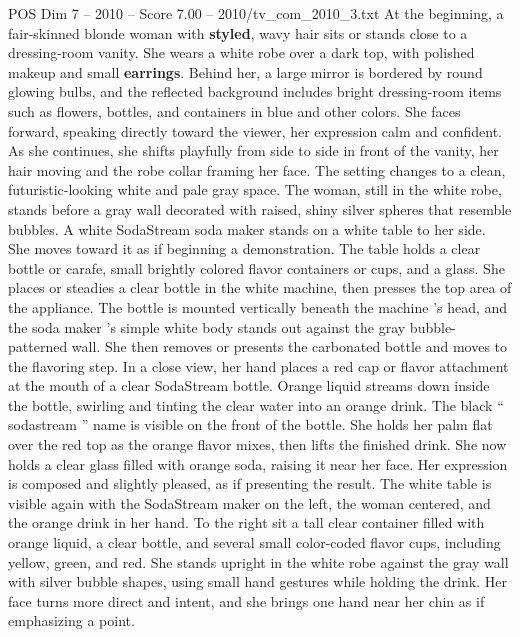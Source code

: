 \begin{textsample}{POS Dim 7 – 2010 – Score 7.00 – 2010/tv\_com\_2010\_3.txt}  \label{ex:f7_pos_057}
At the beginning, a fair-skinned blonde woman with \textbf{styled}, wavy hair sits or stands close to a dressing-room vanity.
She wears a white robe over a dark top, with polished makeup and small \textbf{earrings}.
Behind her, a large mirror is bordered by round glowing bulbs, and the reflected background includes bright dressing-room items such as flowers, bottles, and containers in blue and other colors.
She faces forward, speaking directly toward the viewer, her expression calm and confident.
As she continues, she shifts playfully from side to side in front of the vanity, her hair moving and the robe collar framing her face.
The setting changes to a clean, futuristic-looking white and pale gray space.
The woman, still in the white robe, stands before a gray wall decorated with raised, shiny silver spheres that resemble bubbles.
A white SodaStream soda maker stands on a white table to her side.
She moves toward it as if beginning a demonstration.
The table holds a clear bottle or carafe, small brightly colored flavor containers or cups, and a glass.
She places or steadies a clear bottle in the white machine, then presses the top area of the appliance.
The bottle is mounted vertically beneath the machine ’s head, and the soda maker ’s simple white body stands out against the gray bubble-patterned wall.
She then removes or presents the carbonated bottle and moves to the flavoring step.
In a close view, her hand places a red cap or flavor attachment at the mouth of a clear SodaStream bottle.
Orange liquid streams down inside the bottle, swirling and tinting the clear water into an orange drink.
The black “ sodastream ” name is visible on the front of the bottle.
She holds her palm flat over the red top as the orange flavor mixes, then lifts the finished drink.
She now holds a clear glass filled with orange soda, raising it near her face.
Her expression is composed and slightly pleased, as if presenting the result.
The white table is visible again with the SodaStream maker on the left, the woman centered, and the orange drink in her hand.
To the right sit a tall clear container filled with orange liquid, a clear bottle, and several small color-coded flavor cups, including yellow, green, and red.
She stands upright in the white robe against the gray wall with silver bubble shapes, using small hand gestures while holding the drink.
Her face turns more direct and intent, and she brings one hand near her chin as if emphasizing a point.

\end{textsample}
